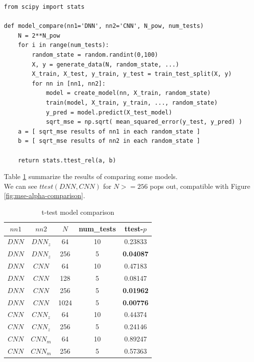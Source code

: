 \documentclass[a4paper, 12pt]{report}
\begin{document}
\begin{verbatim}
from scipy import stats

def model_compare(nn1='DNN', nn2='CNN', N_pow, num_tests)
    N = 2**N_pow
    for i in range(num_tests):
        random_state = random.randint(0,100)
        X, y = generate_data(N, random_state, ...)
        X_train, X_test, y_train, y_test = train_test_split(X, y)
        for nn in [nn1, nn2]:
            model = create_model(nn, X_train, random_state)
            train(model, X_train, y_train, ..., random_state)
            y_pred = model.predict(X_test_model)
            sqrt_mse = np.sqrt( mean_squared_error(y_test, y_pred) )
    a = [ sqrt_mse results of nn1 in each random_state ]
    b = [ sqrt_mse results of nn2 in each random_state ]

    return stats.ttest_rel(a, b)
\end{verbatim}

Table \ref{table:ttest-comparison} summarize the results of comparing some models.\\
We can see $ttest(DNN, CNN)$ for $N >= 256$ pops out, compatible with Figure \ref{fig:mse-alpha-comparison}.

\begin{table}[h!]
    \scriptsize
    \centering
    \begin{tabular}{||c c c c c||} 
        \hline
        $nn1$ & $nn2$ & $N$ & num\_tests & ttest-$p$ \\ [0.5ex] 
        \hline\hline
        $DNN$ & $DNN_z$ & 64 & 10 & 0.23833 \\ 
        \hline
        $DNN$ & $DNN_z$ & 256 & 5 & \textbf{0.04087} \\ 
        \hline
        $DNN$ & $CNN$ & 64 & 10 & 0.47183 \\ 
        \hline
        $DNN$ & $CNN$ & 128 & 5 & 0.08147 \\ 
        \hline
        \rowcolor{yellow}
        $DNN$ & $CNN$ & 256 & 5 & \textbf{0.01962} \\ 
        \hline
        \rowcolor{yellow}
        $DNN$ & $CNN$ & 1024 & 5 & \textbf{0.00776} \\ 
        \hline
        $CNN$ & $CNN_z$ & 64 & 10 & 0.44374 \\ 
        \hline
        $CNN$ & $CNN_z$ & 256 & 5 & 0.24146 \\ 
        \hline
        $CNN$ & $CNN_m$ & 64 & 10 & 0.89247 \\ 
        \hline
        $CNN$ & $CNN_m$ & 256 & 5 & 0.57363 \\ 
        \hline
    \end{tabular}
    \caption{t-test model comparison}
    \label{table:ttest-comparison}
\end{table}
\end{document}
